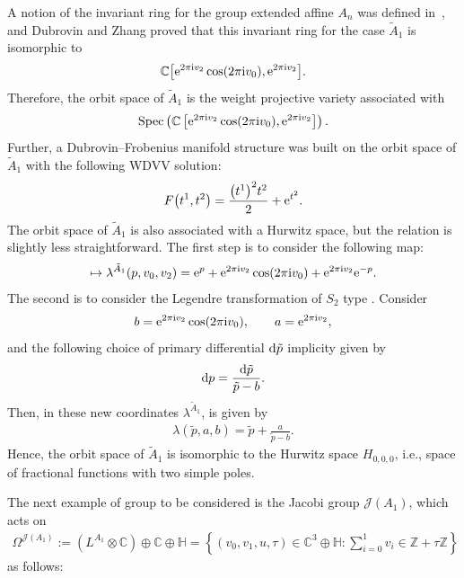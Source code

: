 \documentclass[10pt,a4paper]{amsart}
\numberwithin{equation}{section}
\newcommand{\Ja}{\mathcal{J}}
\begin{document}
A notion of the invariant ring for the group extended affine $A_n$ was defined in~\cite{B.DubrovinandY.Zhang}, and Dubrovin and Zhang proved that this invariant ring for the case $\tilde A_1$ is isomorphic to
\begin{gather*}
\mathbb{C}\big[{\rm e}^{2\pi {\rm i} v_2}\cos(2\pi {\rm i} v_0),{\rm e}^{2\pi {\rm i} v_2}\big].
\end{gather*}
 Therefore, the orbit space of $\tilde A_1$ is the weight projective variety associated with
\begin{gather*}
 \mathop{\rm Spec}\left(\mathbb{C}\left[{\rm e}^{2\pi {\rm i} v_2}\cos(2\pi {\rm i} v_0),{\rm e}^{2\pi {\rm i} v_2}\right]\right).
\end{gather*}
 Further, a Dubrovin--Frobenius manifold structure was built on the orbit space of $\tilde A_1$ with the following WDVV solution:
\begin{gather}\label{WDVV Dub-Zhang}
F\big(t^1,t^2\big)=\frac{\big(t^1\big)^2t^2}{2}+{\rm e}^{t^2}.
\end{gather}
The orbit space of $\tilde A_1$ is also associated with a Hurwitz space, but the relation is slightly less straightforward. The first step is to consider the following map:
\begin{gather*}
[v_0,v_2]\mapsto \lambda^{\tilde A_1}(p,v_0,v_2)={\rm e}^p+{\rm e}^{2\pi {\rm i} v_2}\cos(2\pi {\rm i} v_0)+{\rm e}^{2\pi {\rm i} v_2}{\rm e}^{-p}.
\end{gather*}
The second is to consider the Legendre transformation of $S_2$ type \cite[Appendix~B and Chapter~5]{B.Dubrovin2}. Consider
\begin{gather*}
b={\rm e}^{2\pi {\rm i} v_2}\cos(2\pi {\rm i} v_0), \qquad a={\rm e}^{2\pi {\rm i}v_2},
\end{gather*}
and the following choice of primary differential ${\rm d}\tilde p$ implicity given by
\begin{gather*}
{\rm d}p=\frac{{\rm d}\tilde p}{\tilde p-b}.
\end{gather*}
Then, in these new coordinates $\lambda^{\tilde A_1}$, is given by
\begin{gather*}
\lambda(\tilde p, a,b)=\tilde p+\frac{a}{\tilde p-b}.
\end{gather*}
Hence, the orbit space of $\tilde A_1$ is isomorphic to the Hurwitz space $H_{0,0,0}$, i.e., space of fractional functions with two simple poles.

The next example of group to be considered is the Jacobi group $\Ja(A_1)$, which acts on
\begin{gather*}
\Omega^{\Ja(A_1)}:=\left(L^{A_1}\otimes\mathbb{C}\right)\oplus \mathbb{C}\oplus\mathbb{H}=\left\{(v_0,v_1,u,\tau)\in \mathbb{C}^3\oplus\mathbb{H}\colon\sum_{i=0}^1 v_i\in\mathbb{Z}+\tau\mathbb{Z} \right\}
\end{gather*}
 as follows:
\end{document}
